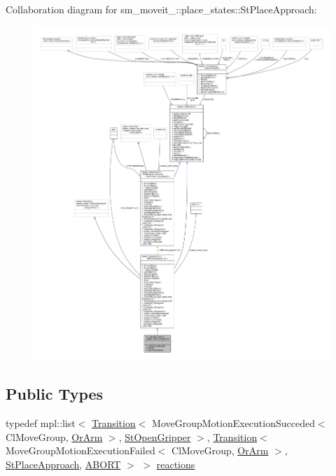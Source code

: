 Collaboration diagram for sm\+\_\+moveit\+\_\+:\+:place\+\_\+states\+:\+:St\+Place\+Approach\+:
\nopagebreak
\begin{figure}[H]
\begin{center}
\leavevmode
\includegraphics[width=350pt]{structsm__moveit__4_1_1place__states_1_1StPlaceApproach__coll__graph}
\end{center}
\end{figure}
\subsection*{Public Types}
\begin{DoxyCompactItemize}
\item 
typedef mpl\+::list$<$ \hyperlink{classsmacc_1_1Transition}{Transition}$<$ Move\+Group\+Motion\+Execution\+Succeded$<$ Cl\+Move\+Group, \hyperlink{classsm__moveit__4_1_1OrArm}{Or\+Arm} $>$, \hyperlink{structsm__moveit__4_1_1place__states_1_1StOpenGripper}{St\+Open\+Gripper} $>$, \hyperlink{classsmacc_1_1Transition}{Transition}$<$ Move\+Group\+Motion\+Execution\+Failed$<$ Cl\+Move\+Group, \hyperlink{classsm__moveit__4_1_1OrArm}{Or\+Arm} $>$, \hyperlink{structsm__moveit__4_1_1place__states_1_1StPlaceApproach}{St\+Place\+Approach}, \hyperlink{structsmacc_1_1default__transition__tags_1_1ABORT}{A\+B\+O\+RT} $>$ $>$ \hyperlink{structsm__moveit__4_1_1place__states_1_1StPlaceApproach_a9aed5942585d30a8f47a96e749f6fa6a}{reactions}
\end{DoxyCompactItemize}
